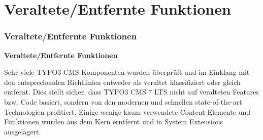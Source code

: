 %

\section{Veraltete/Entfernte Funktionen}
\begin{frame}[fragile]
	\frametitle{Veraltete/Entfernte Funktionen}

	\begin{center}\huge{\color{typo3darkgrey}\textbf{Veraltete/Entfernte Funktionen}}\end{center}

	Sehr viele TYPO3 CMS Komponenten wurden überprüft und im Einklang mit den
	entsprechenden Richtlinien entweder als veraltet klassifiziert oder gleich
	entfernt.\newline
	Dies stellt sicher, dass TYPO3 CMS 7 LTS nicht auf veralteten Features bzw. Code
	basiert, sondern von den modernen und schnellen state-of-the-art Technologien
	profitiert.\newline
	Einige wenige kaum verwendete Content-Elemente und Funktionen wurden aus dem Kern
	erntfernt und in System Extensions ausgelagert.

\end{frame}

